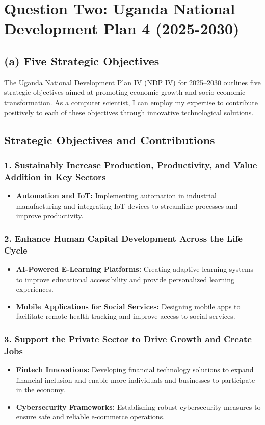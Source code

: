 \documentclass[11pt]{article}
\begin{document}
\newpage
\section*{Question Two: Uganda National Development Plan 4 (2025-2030)}
\subsection*{(a) Five Strategic Objectives}
The Uganda National Development Plan IV (NDP IV) for 2025–2030 outlines five strategic objectives aimed at promoting economic growth and socio-economic transformation. As a computer scientist, I can employ my expertise to contribute positively to each of these objectives through innovative technological solutions.

\subsection*{Strategic Objectives and Contributions}

\subsubsection*{1. Sustainably Increase Production, Productivity, and Value Addition in Key Sectors}
\begin{itemize}
    \item \textbf{Automation and IoT:} Implementing automation in industrial manufacturing and integrating IoT devices to streamline processes and improve productivity.
\end{itemize}

\subsubsection*{2. Enhance Human Capital Development Across the Life Cycle}
\begin{itemize}
    \item \textbf{AI-Powered E-Learning Platforms:} Creating adaptive learning systems to improve educational accessibility and provide personalized learning experiences.
    \item \textbf{Mobile Applications for Social Services:} Designing mobile apps to facilitate remote health tracking and improve access to social services.
\end{itemize}

\subsubsection*{3. Support the Private Sector to Drive Growth and Create Jobs}
\begin{itemize}
    \item \textbf{Fintech Innovations:} Developing financial technology solutions to expand financial inclusion and enable more individuals and businesses to participate in the economy.
    \item \textbf{Cybersecurity Frameworks:} Establishing robust cybersecurity measures to ensure safe and reliable e-commerce operations.
\end{itemize}
\end{document}
